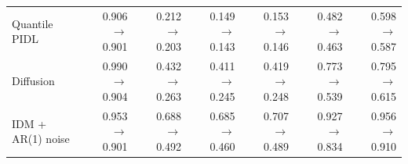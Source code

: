 \begin{table}[htbp]
\begin{tabular}{lrrrrrr}
Quantile PIDL & 0.906 $\rightarrow$ 0.901 & 0.212 $\rightarrow$ 0.203 & 0.149 $\rightarrow$ 0.143 & 0.153 $\rightarrow$ 0.146 & 0.482 $\rightarrow$ 0.463 & 0.598 $\rightarrow$ 0.587 \\
Diffusion & 0.990 $\rightarrow$ 0.904 & 0.432 $\rightarrow$ 0.263 & 0.411 $\rightarrow$ 0.245 & 0.419 $\rightarrow$ 0.248 & 0.773 $\rightarrow$ 0.539 & 0.795 $\rightarrow$ 0.615 \\
IDM + AR(1) noise & 0.953 $\rightarrow$ 0.901 & 0.688 $\rightarrow$ 0.492 & 0.685 $\rightarrow$ 0.460 & 0.707 $\rightarrow$ 0.489 & 0.927 $\rightarrow$ 0.834 & 0.956 $\rightarrow$ 0.910 \\
\bottomrule
\end{tabular}
\end{table}
